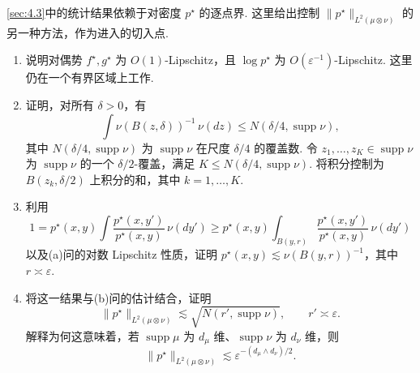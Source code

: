 \begin{exercise}\label{exer:4.8}
\autoref{sec:4.3}中的统计结果依赖于对密度 $p^\star$ 的逐点界. 这里给出控制 $\|p^\star\|_{L^2(\mu\otimes\nu)}$ 的另一种方法，作为进入\cite{ref292}的切入点.
\begin{enumerate}\renewcommand{\labelenumi}{(\alph{enumi})}
\item 说明对偶势 $f^\star,g^\star$ 为 $O(1)$-Lipschitz，且 $\log p^\star$ 为 $O(\varepsilon^{-1})$-Lipschitz. 这里仍在一个有界区域上工作.
\item 证明，对所有 $\delta>0$，有
$$\int\nu(B(z,\delta))^{-1}\,\nu(dz)\le N(\delta/4,\operatorname{supp}\nu),$$
其中 $N(\delta/4,\operatorname{supp}\nu)$ 为 $\operatorname{supp}\nu$ 在尺度 $\delta/4$ 的覆盖数. 令 $z_1,\ldots,z_K\in\operatorname{supp}\nu$ 为 $\operatorname{supp}\nu$ 的一个 $\delta/2$-覆盖，满足 $K\le N(\delta/4,\operatorname{supp}\nu)$. 将积分控制为 $B(z_k,\delta/2)$ 上积分的和，其中 $k=1,\ldots,K$.
\item 利用
$$1=p^\star(x,y)\int\frac{p^\star(x,y')}{p^\star(x,y)}\,\nu(dy')
\ge p^\star(x,y)\int_{B(y,r)}\frac{p^\star(x,y')}{p^\star(x,y)}\,\nu(dy')$$
以及(a)问的对数 Lipschitz 性质，证明 $p^\star(x,y)\lesssim\nu(B(y,r))^{-1}$，其中 $r\asymp\varepsilon$.
\item 将这一结果与(b)问的估计结合，证明
$$\|p^\star\|_{L^2(\mu\otimes\nu)}\lesssim\sqrt{N(r',\operatorname{supp}\nu)},\qquad r'\asymp\varepsilon.$$
解释为何这意味着，若 $\operatorname{supp}\mu$ 为 $d_\mu$ 维、$\operatorname{supp}\nu$ 为 $d_\nu$ 维，则
$$\|p^\star\|_{L^2(\mu\otimes\nu)}\lesssim\varepsilon^{-(d_\mu\wedge d_\nu)/2}.$$
\end{enumerate}
\end{exercise}
